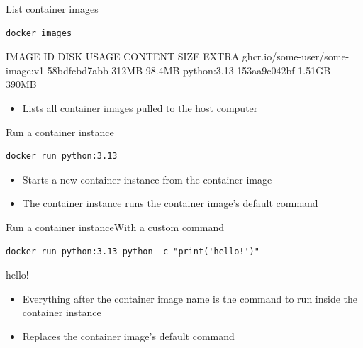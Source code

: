\documentclass[aspectratio=169]{beamer}
\begin{document}
\begin{frame}[fragile]{List container images}
  \begin{verbatim}
docker images
  \end{verbatim}
  \begin{cmdoutput}
IMAGE                             ID             DISK USAGE   CONTENT SIZE   EXTRA
ghcr.io/some-user/some-image:v1   58bdfcbd7abb        312MB         98.4MB
python:3.13                       153aa9c042bf       1.51GB          390MB
  \end{cmdoutput}

  \begin{itemize}
    \item Lists all container images pulled to the host computer
  \end{itemize}

\note{
}
\end{frame}


\begin{frame}[fragile]{Run a container instance}
  \begin{verbatim}
docker run python:3.13
  \end{verbatim}

  \begin{itemize}
    \item Starts a new container instance from the container image
    \item The container instance runs the container image's default command
  \end{itemize}

\note{
}
\end{frame}


\begin{frame}[fragile]{Run a container instance}{With a custom command}
  \begin{verbatim}
docker run python:3.13 python -c "print('hello!')"
  \end{verbatim}
  \begin{cmdoutput}
hello!
  \end{cmdoutput}

  \begin{itemize}
    \item Everything after the container image name is the command to run inside the container instance
    \item Replaces the container image's default command
  \end{itemize}

\note{
}
\end{frame}
\end{document}
